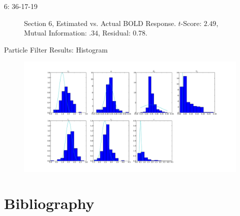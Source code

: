 \documentclass{beamer}
\begin{document}
\begin{frame}{6: 36-17-19}
\setcounter{subfigure}{0}
\begin{figure}
\centering
{}
\caption{Section 6, Estimated vs. Actual BOLD Response. $t$-Score: $2.49$, Mutual Information: $.34$, Residual: $0.78$.}
\end{figure}
\end{frame}

\begin{frame}{Particle Filter Results: Histogram}
\begin{figure}
\centering
\includegraphics[clip=truew,trim=8cm 4cm 8cm 4cm,width=.8\textwidth]{realhist}
\end{figure}
\end{frame}

\section{Bibliography}
\begin{frame}[allowframebreaks]
  
  
\end{frame}
\end{document}
